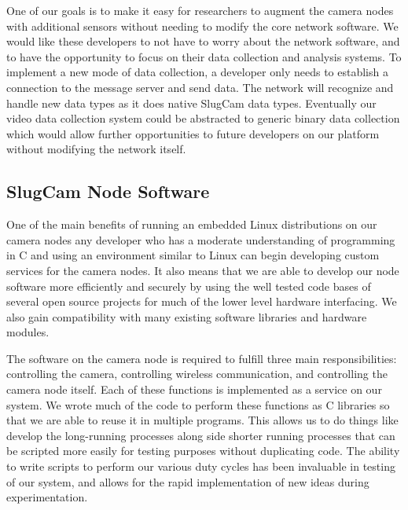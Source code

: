 
One of our goals is to make it easy for researchers to augment the camera nodes
with additional sensors without needing to modify the core network software. We
would like these developers to not have to worry about the network software, and
to have the opportunity to focus on their data collection and analysis systems.
To implement a new mode of data collection, a developer only needs to establish
a connection to the message server and send data. The network will recognize and
handle new data types as it does native SlugCam data types. Eventually our video
data collection system could be abstracted to generic binary data collection
which would allow further opportunities to future developers on our platform
without modifying the network itself.

\subsection{SlugCam Node Software}

One of the main benefits of running an embedded Linux distributions on our
camera nodes any developer who has a moderate understanding of programming in C
and using an environment similar to Linux can begin developing custom services
for the camera nodes. It also means that we are able to develop our node
software more efficiently and securely by using the well tested code bases of
several open source projects for much of the lower level hardware interfacing.
We also gain compatibility with many existing software libraries and hardware
modules.

The software on the camera node is required to fulfill three main
responsibilities: controlling the camera, controlling wireless communication,
and controlling the camera node itself. Each of these functions is implemented
as a service on our system. We wrote much of the code to perform these functions
as C libraries so that we are able to reuse it in multiple programs. This
allows us to do things like develop the long-running processes along side
shorter running processes that can be scripted more easily for testing purposes
without duplicating code. The ability to write scripts to perform our various
duty cycles has been invaluable in testing of our system, and allows for the
rapid implementation of new ideas during experimentation.

